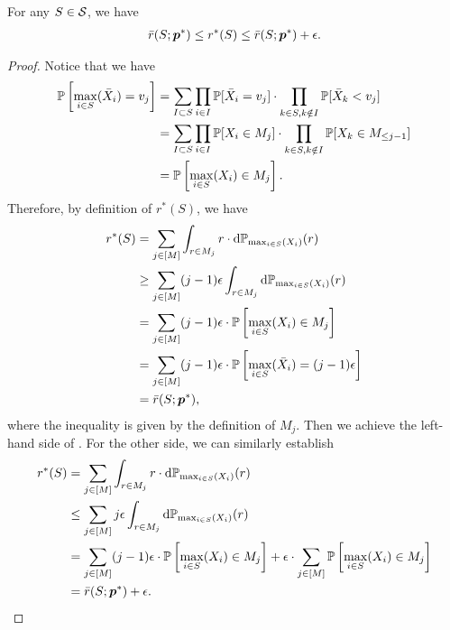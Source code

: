 \begin{lemma}\label{lemma:discrete-error-formal}
For any $S \in {\mathcal{S}}$, we have
\begin{align}\label{eq:discrete-error}
    \bar r(S; {\bm{p}}^*) \le r^*(S) \le \bar r(S; {\bm{p}}^*) + \epsilon.
\end{align}
\begin{proof}
Notice that we have 
\begin{align*}
    {\mathbb{P}}\left[\max_{i\in S} (\bar X_i) = v_j\right] &= \sum_{I\subset S} \prod_{i\in I}{\mathbb{P}}[\bar X_i = v_j] \cdot \prod_{k \in S, k \notin I}{\mathbb{P}}[\bar X_k < v_j] \\
    &= \sum_{I\subset S} \prod_{i\in I} {\mathbb{P}}[X_i \in M_j] \cdot \prod_{k \in S, k \notin I}{\mathbb{P}}[X_k \in M_{\le j-1}] \\
    &= {\mathbb{P}}\left[\max_{i \in S} (X_i) \in M_j\right].
\end{align*}
Therefore, by definition of $r^*(S)$, we have
\begin{align*}
    r^*(S) &= \sum_{j\in [M]} \int_{r \in M_j} r\cdot {\textnormal{d}}{\mathbb{P}}_{\max_{i\in S}(X_i)}(r) \\
    &\ge \sum_{j\in [M]} (j-1)\epsilon \int_{r \in M_j} {\textnormal{d}}{\mathbb{P}}_{\max_{i\in S}(X_i)}(r) \\
    &= \sum_{j\in [M]} (j-1)\epsilon \cdot {\mathbb{P}}\left[\max_{i \in S} (X_i) \in M_j\right] \\
    &= \sum_{j\in [M]} (j-1)\epsilon \cdot {\mathbb{P}}\left[\max_{i\in S} (\bar X_i) = (j-1)\epsilon\right] \\
    &= \bar r(S; {\bm{p}}^*),
\end{align*}
where the inequality is given by the definition of $M_j$. Then we achieve the left-hand side of . For the other side, we can similarly establish
\begin{align*}
    r^*(S) &= \sum_{j\in [M]} \int_{r \in M_j} r\cdot {\textnormal{d}}{\mathbb{P}}_{\max_{i\in S}(X_i)}(r) \\
    &\le \sum_{j\in [M]} j\epsilon \int_{r \in M_j} {\textnormal{d}}{\mathbb{P}}_{\max_{i\in S}(X_i)}(r) \\
    &= \sum_{j\in [M]} (j - 1)\epsilon \cdot {\mathbb{P}}\left[\max_{i \in S} (X_i) \in M_j\right] + \epsilon \cdot  \sum_{j\in [M]}  {\mathbb{P}}\left[\max_{i \in S} (X_i) \in M_j\right]\\
    &= \bar r(S; {\bm{p}}^*) + \epsilon.
\end{align*}
\end{proof}
\end{lemma}

